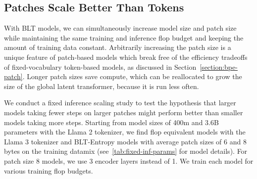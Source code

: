 \begin{table}[t]
    \centering
    \caption{Details of models used in the fixed-inference scaling study. We report non-embedding parameters for each model and their relative number compared to Llama 2. We pick model sizes with equal inference flops per byte. We also indicate BPE's compute-optimal training data quantity and the crossover point where {\textsc BLT} surpasses BPE as seen in \autoref{fig:fixed_inference_scaling} (both expressed in bytes of training data). This point is achieved at much smaller scales compared to many modern training budgets.}
    \label{tab:fixed-inf-params}
\end{table}

\subsection{Patches Scale Better Than Tokens} With {\textsc BLT} models, we can simultaneously increase model size and patch size while maintaining the same training and inference flop budget and keeping the amount of training data constant. Arbitrarily increasing the patch size is a unique feature of patch-based models which break free of the efficiency tradeoffs of fixed-vocabulary token-based models, as discussed in Section~\ref{section:bpe-patch}. Longer patch sizes save compute, which can be reallocated to grow the size of the global latent transformer, because it is run less often.

We conduct a fixed inference scaling study to test the hypothesis that larger models taking fewer steps on larger patches might perform better than smaller models taking more steps. Starting from model sizes of 400m and 3.6B parameters with the Llama 2 tokenizer, we find flop equivalent models with the Llama 3 tokenizer and {\textsc BLT}-Entropy models with average patch sizes of 6 and 8 bytes on the training datamix (see~\autoref{tab:fixed-inf-params} for model details). For patch size 8 models, we use 3 encoder layers instead of 1. We train each model for various training flop budgets.

